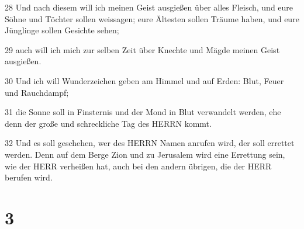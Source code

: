 \par 28 Und nach diesem will ich meinen Geist ausgießen über alles Fleisch, und eure Söhne und Töchter sollen weissagen; eure Ältesten sollen Träume haben, und eure Jünglinge sollen Gesichte sehen;
\par 29 auch will ich mich zur selben Zeit über Knechte und Mägde meinen Geist ausgießen.
\par 30 Und ich will Wunderzeichen geben am Himmel und auf Erden: Blut, Feuer und Rauchdampf;
\par 31 die Sonne soll in Finsternis und der Mond in Blut verwandelt werden, ehe denn der große und schreckliche Tag des HERRN kommt.
\par 32 Und es soll geschehen, wer des HERRN Namen anrufen wird, der soll errettet werden. Denn auf dem Berge Zion und zu Jerusalem wird eine Errettung sein, wie der HERR verheißen hat, auch bei den andern übrigen, die der HERR berufen wird.

\chapter{3}


